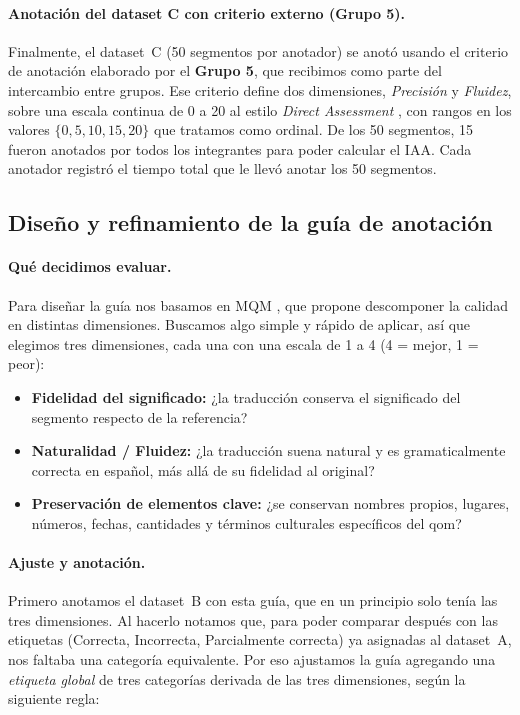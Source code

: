 \paragraph{Anotación del dataset C con criterio externo (Grupo 5).}
Finalmente, el dataset~C (50 segmentos por anotador) se anotó usando el criterio
de anotación elaborado por el \textbf{Grupo 5}, que recibimos como parte del
intercambio entre grupos. Ese criterio define dos dimensiones, \emph{Precisión} y
\emph{Fluidez}, sobre una escala continua de 0 a 20 al estilo \emph{Direct
Assessment} \citep{graham2013da}, con rangos en los valores
$\{0,5,10,15,20\}$ que tratamos como ordinal. De los 50 segmentos, 15 fueron anotados por todos los
integrantes para poder calcular el IAA. Cada anotador registró el tiempo total que
le llevó anotar los 50 segmentos.

\subsection{Diseño y refinamiento de la guía de anotación}
\label{sec:metodologia-guia}

\paragraph{Qué decidimos evaluar.}
Para diseñar la guía nos basamos en MQM \citep{lommel2014mqm}, que propone
descomponer la calidad en distintas dimensiones. Buscamos algo simple y rápido de
aplicar, así que elegimos tres dimensiones, cada una con una escala de 1 a 4
(4 = mejor, 1 = peor):

\begin{itemize}
  \item \textbf{Fidelidad del significado:} ¿la traducción conserva el
  significado del segmento respecto de la referencia?
  \item \textbf{Naturalidad / Fluidez:} ¿la traducción suena natural y es
  gramaticalmente correcta en español, más allá de su fidelidad al original?
  \item \textbf{Preservación de elementos clave:} ¿se conservan nombres propios,
  lugares, números, fechas, cantidades y términos culturales específicos del qom?
\end{itemize}

\paragraph{Ajuste y anotación.}
Primero anotamos el dataset~B con esta guía, que en un principio solo tenía las
tres dimensiones. Al hacerlo notamos que, para poder comparar después con las
etiquetas (Correcta, Incorrecta, Parcialmente correcta) ya asignadas al
dataset~A, nos faltaba una categoría equivalente. Por eso ajustamos la guía
agregando una \emph{etiqueta global} de tres categorías derivada de las tres
dimensiones, según la siguiente regla:

